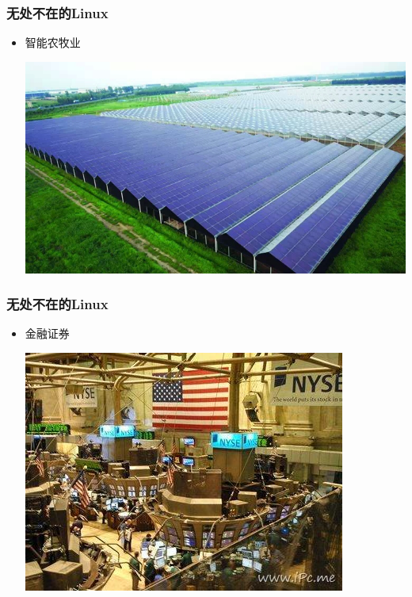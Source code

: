 \documentclass[xcolor=svgnames,presentation]{beamer}
\begin{document}
\begin{frame}
\frametitle{无处不在的Linux}
\label{sec-2-4-7}
\begin{itemize}

\item 智能农牧业
\label{sec-2-4-7-1}%
\begin{center}
\includegraphics[width=.9\linewidth]{img/nongye.jpg}
\end{center}

\end{itemize} %
\end{frame}
\begin{frame}
\frametitle{无处不在的Linux}
\label{sec-2-4-8}
\begin{itemize}

\item 金融证券
\label{sec-2-4-8-1}%
\begin{center}
\includegraphics[width=.9\linewidth]{img/jinrong.jpg}
\end{center}

\end{itemize} %
\end{frame}
\end{document}
